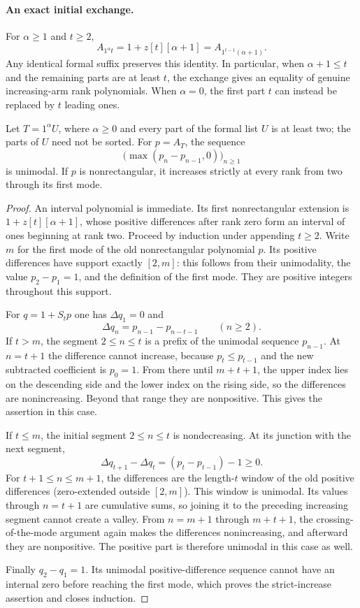 \paragraph{An exact initial exchange.}
For $\alpha\ge1$ and $t\ge2$,
\[
 A_{1^\alpha t}=1+z[t][\alpha+1]
              =A_{1^{t-1}(\alpha+1)}.
\]
Any identical formal suffix preserves this identity. In particular,
when $\alpha+1\le t$ and the remaining parts are at least $t$,
the exchange gives an equality of genuine increasing-arm rank
polynomials. When $\alpha=0$, the first part $t$ can instead be
replaced by $t$ leading ones.

\begin{proposition}
Let $T=1^\alpha U$, where $\alpha\ge0$ and every part of the
formal list $U$ is at least two; the parts of $U$ need not be sorted.
For $p=A_T$, the sequence
\[
 \bigl(\max(p_n-p_{n-1},0)\bigr)_{n\ge1}
\]
is unimodal. If $p$ is nonrectangular, it increases strictly at
every rank from two through its first mode.
\end{proposition}
\begin{proof}
An interval polynomial is immediate. Its first nonrectangular
extension is $1+z[t][\alpha+1]$, whose positive differences after
rank zero form an interval of ones beginning at rank two.
Proceed by induction under appending $t\ge2$. Write $m$ for
the first mode of the old nonrectangular polynomial $p$.
Its positive differences have support exactly $[2,m]$: this
follows from their unimodality, the value $p_2-p_1=1$, and
the definition of the first mode. They are positive integers
throughout this support.

For $q=1+S_tp$ one has $\Delta q_1=0$ and
\[
 \Delta q_n=p_{n-1}-p_{n-t-1}\qquad(n\ge2).
\]
If $t>m$, the segment $2\le n\le t$ is a prefix of the
unimodal sequence $p_{n-1}$. At $n=t+1$ the difference cannot
increase, because $p_t\le p_{t-1}$ and the new subtracted
coefficient is $p_0=1$. From there until $m+t+1$, the upper
index lies on the descending side and the lower index on the
rising side, so the differences are nonincreasing. Beyond that
range they are nonpositive. This gives the assertion in this case.

If $t\le m$, the initial segment $2\le n\le t$ is
nondecreasing. At its junction with the next segment,
\[
 \Delta q_{t+1}-\Delta q_t=(p_t-p_{t-1})-1\ge0.
\]
For $t+1\le n\le m+1$, the differences are the length-$t$
window of the old positive differences (zero-extended outside
$[2,m]$). This window is unimodal. Its values through $n=t+1$
are cumulative sums, so joining it to the preceding increasing
segment cannot create a valley. From $n=m+1$ through $m+t+1$,
the crossing-of-the-mode argument again makes the differences
nonincreasing, and afterward they are nonpositive. The positive
part is therefore unimodal in this case as well.

Finally $q_2-q_1=1$. Its unimodal positive-difference sequence
cannot have an internal zero before reaching the first mode,
which proves the strict-increase assertion and closes induction.
\end{proof}

